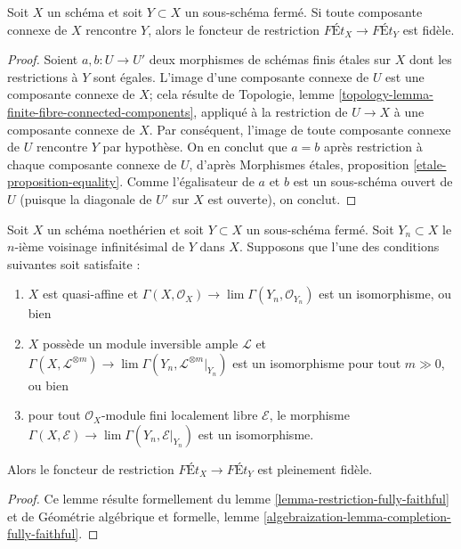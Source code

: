 \begin{lemma}
\label{lemma-restriction-faithful}
Soit $X$ un schéma et soit $Y \subset X$ un sous-schéma fermé.
Si toute composante connexe de $X$ rencontre $Y$, alors
le foncteur de restriction $\textit{F\'Et}_X \to \textit{F\'Et}_Y$
est fidèle.
\end{lemma}

\begin{proof}
Soient $a, b : U \to U'$ deux morphismes de schémas finis étales sur $X$
dont les restrictions à $Y$ sont égales. L'image d'une composante connexe
de $U$ est une composante connexe de $X$; cela résulte de
Topologie, lemme \ref{topology-lemma-finite-fibre-connected-components},
appliqué à la restriction de $U \to X$ à une composante connexe de $X$.
Par conséquent, l'image de toute composante connexe de $U$ rencontre $Y$
par hypothèse. On en conclut que $a = b$ après restriction à chaque
composante connexe de $U$, d'après Morphismes étales, proposition
\ref{etale-proposition-equality}. Comme l'égalisateur de $a$ et $b$
est un sous-schéma ouvert de $U$ (puisque la diagonale de $U'$ sur $X$ est ouverte),
on conclut.
\end{proof}

\begin{lemma}
\label{lemma-restriction-fully-faithful-special}
Soit $X$ un schéma noethérien et soit $Y \subset X$ un sous-schéma fermé.
Soit $Y_n \subset X$ le $n$-ième voisinage infinitésimal de $Y$ dans $X$.
Supposons que l'une des conditions suivantes soit satisfaite :
\begin{enumerate}
\item $X$ est quasi-affine et
$\Gamma(X, \mathcal{O}_X) \to \lim \Gamma(Y_n, \mathcal{O}_{Y_n})$
est un isomorphisme, ou bien
\item $X$ possède un module inversible ample $\mathcal{L}$ et
$\Gamma(X, \mathcal{L}^{\otimes m}) \to
\lim \Gamma(Y_n, \mathcal{L}^{\otimes m}|_{Y_n})$
est un isomorphisme pour tout $m \gg 0$, ou bien
\item pour tout $\mathcal{O}_X$-module fini localement libre
$\mathcal{E}$, le morphisme
$\Gamma(X, \mathcal{E}) \to \lim \Gamma(Y_n, \mathcal{E}|_{Y_n})$
est un isomorphisme.
\end{enumerate}
Alors le foncteur de restriction $\textit{F\'Et}_X \to \textit{F\'Et}_Y$
est pleinement fidèle.
\end{lemma}

\begin{proof}
Ce lemme résulte formellement du
lemme \ref{lemma-restriction-fully-faithful} et de
Géométrie algébrique et formelle, lemme
\ref{algebraization-lemma-completion-fully-faithful}.
\end{proof}

